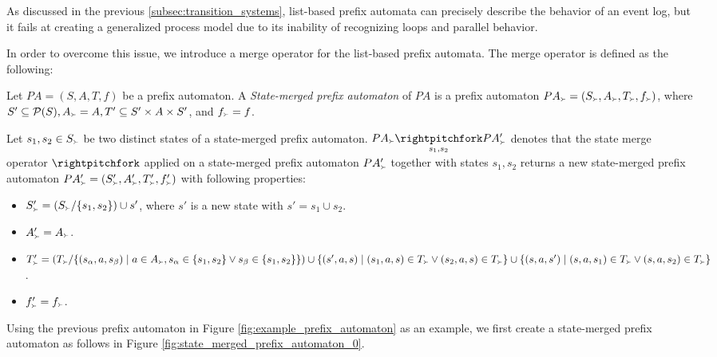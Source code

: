 As discussed in the previous \cref{subsec:transition_systems}, list-based prefix automata can precisely describe the behavior of an event log, but it fails at creating a generalized process model due to its inability of recognizing loops and parallel behavior.

In order to overcome this issue, we introduce a merge operator for the list-based prefix automata. The merge operator is defined as the following:

\begin{definition}
    Let $PA = (S, A, T, f)$ be a prefix automaton. A \emph{State-merged prefix automaton} of $PA$ is a prefix automaton $PA_{\Yright} = (S_{\Yright}, A_{\Yright}, T_{\Yright}, f_{\Yright})$, where $S' \subseteq \mathcal{P}(S), A_{\Yright} = A,  T' \subseteq S' \times A \times S'$, and $f_{\Yright} = f$.

    Let $s_1, s_2 \in S_{\Yright}$ be two distinct states of a state-merged prefix automaton. $ PA_{\Yright} \underset{s_1, s_2}{\rightpitchfork} PA_{\Yright}'$ denotes that the state merge operator $\rightpitchfork$ applied on a state-merged prefix automaton $PA_{\Yright}'$ together with states $s_1, s_2$ returns a new state-merged prefix automaton $PA_{\Yright}' = (S_{\Yright}', A_{\Yright}', T_{\Yright}', f_{\Yright}')$ with following properties:

    \begin{itemize}
        \item $S_{\Yright}' = ( S_{\Yright} / \{s_1, s_2\} ) \cup s'$, where $s'$ is a new state with $s' = s_1 \cup s_2$.
        \item $A_{\Yright}' = A_{\Yright}$.
        \item $T_{\Yright}' = (T_{\Yright} / \{ (s_{\alpha}, a, s_{\beta}) \mid a \in A_{\Yright}, s_{\alpha} \in \{s_1, s_2 \} \lor s_{\beta} \in \{s_1, s_2\} \}) \cup \{ (s', a, s) \mid (s_1, a, s) \in T_{\Yright} \lor (s_2, a, s) \in T_{\Yright} \} \cup \{ (s, a, s') \mid (s, a, s_1) \in T_{\Yright} \lor (s, a, s_2) \in T_{\Yright} \}$.
        \item $f_{\Yright}' = f_{\Yright}$.
    \end{itemize}    
\end{definition}

Using the previous prefix automaton in Figure \ref{fig:example_prefix_automaton} as an example, we first create a state-merged prefix automaton as follows in Figure \ref{fig:state_merged_prefix_automaton_0}.

